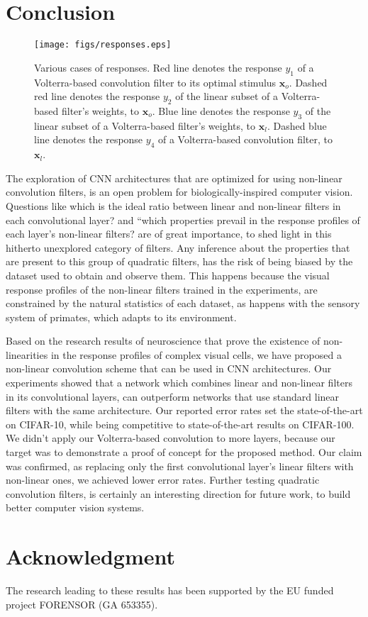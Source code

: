 \documentclass[10pt,twocolumn,letterpaper]{article}
\renewcommand{\vec}[1]{\mathbf{#1}}
\begin{document}
\section{Conclusion}
\label{Conclusion}

\begin{figure*}[t]
  		\centering
  		\texttt{[image: figs/responses.eps]}
  		\caption{Various cases of responses. Red line denotes the response $y_{1}$ of a Volterra-based convolution filter to its optimal stimulus $\vec{x}_o$. Dashed red line denotes the response $y_{2}$ of the linear subset of a Volterra-based filter's weights, to $\vec{x}_o$. Blue line denotes the response $y_{3}$ of the linear subset of a Volterra-based filter's weights, to $\vec{x}_l$. Dashed blue line denotes the response $y_{4}$ of a Volterra-based convolution filter, to $\vec{x}_l$.}
  		\label{fig:resp_plots}
\end{figure*} 

    The exploration of CNN architectures that are optimized for using non-linear convolution filters, is an open problem for biologically-inspired computer vision. Questions like which is the ideal ratio between linear and non-linear filters in each convolutional layer? and ``which properties prevail in the response profiles of each layer's non-linear filters? are of great importance, to shed light in this hitherto unexplored category of filters. Any inference about the properties that are present to this group of quadratic filters, has the risk of being biased by the dataset used to obtain and observe them. This happens because the visual response profiles of the non-linear filters trained in the experiments, are constrained by the natural statistics of each dataset, as happens with the sensory system of primates, which adapts to its environment.

     Based on the research results of neuroscience that prove the existence of non-linearities in the response profiles of complex visual cells, we have proposed a non-linear convolution scheme that can be used in CNN architectures. Our experiments showed that a network which combines linear and non-linear filters in its convolutional layers, can outperform networks that use standard linear filters with the same architecture. Our reported error rates set the state-of-the-art on CIFAR-10, while being competitive to state-of-the-art results on CIFAR-100. We didn't apply our Volterra-based convolution to more layers, because our target was to demonstrate a proof of concept for the proposed method. Our claim was confirmed, as replacing only the first convolutional layer's linear filters with non-linear ones, we achieved lower error rates. Further testing quadratic convolution filters, is certainly an interesting direction for future work, to build better computer vision systems.


\section*{Acknowledgment}

   The research leading to these results has been supported by the EU funded project FORENSOR (GA 653355).



{\small


}
\end{document}
